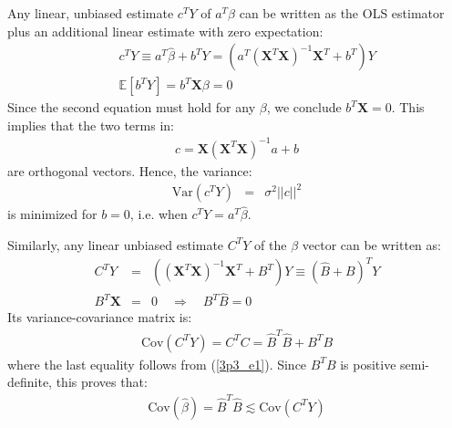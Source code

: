 

Any linear, unbiased estimate $c^T Y$ of $a^T \beta$ can be written as the OLS estimator
plus an additional linear estimate with zero expectation:
\begin{eqnarray*}
    && c^T Y \equiv  a^T \hat{\beta} + b^T Y = \left( a^T \left( \mathbf{X}^T \mathbf{X} \right)^{-1} \mathbf{X}^T + b^T \right) Y \\
    && \mathbb{E} \left[ b^T Y \right] = b^T \mathbf{X} \beta = 0
\end{eqnarray*}
Since the second equation must hold for any $\beta$, we conclude $ b^T \mathbf{X} = 0$. This implies that
the two terms in:
\begin{eqnarray*}
    c = \mathbf{X} \left( \mathbf{X} ^T \mathbf{X}  \right)^{-1} a + b
\end{eqnarray*}
are orthogonal vectors. Hence, the variance:
\begin{eqnarray*}
    \textrm{Var} \left( c^T Y \right) & = & \sigma^2 ||c||^2
\end{eqnarray*}
is minimized for $b=0$, i.e. when $c^T Y = a^T \hat{\beta}$.

Similarly, any linear unbiased estimate $C^T Y$ of the $\beta$ vector can be written as:
\begin{eqnarray} \nonumber
C^T Y & = & \left( \left( \mathbf{X}^T \mathbf{X} \right)^{-1} \mathbf{X} ^T + B^T \right) Y \equiv \left(  \hat{B} + B \right)^T Y\\ \label{3p3_e1}
B^T \mathbf{X} & = & 0 \quad \Longrightarrow \quad B^T \hat{B} = 0
\end{eqnarray}
Its variance-covariance matrix is:
\begin{eqnarray*}
    \textrm{Cov}(C^T Y)  =  C^T C = \hat{B}^T \hat{B} + B^T B
\end{eqnarray*}
where the last equality follows from (\ref{3p3_e1}). Since $B^T B$ is positive semi-definite,
this proves that:
\begin{eqnarray*}
    \textrm{Cov}(\hat{\beta}) = \hat{B}^T \hat{B} \lesssim \textrm{Cov}(C^T Y)
\end{eqnarray*}